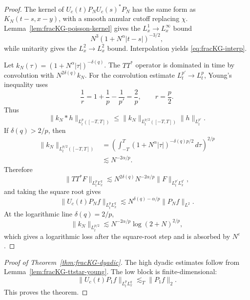 \documentclass[10pt]{amsart}
\numberwithin{equation}{section}
\theoremstyle{plain}
\theoremstyle{definition}
\theoremstyle{remark}
\begin{document}
\begin{proof}
The kernel of $U_c(t)P_NU_c(s)^*P_N$ has the same form as $K_N(t-s,x-y)$, with a smooth annular cutoff replacing $\chi$.  Lemma~\ref{lem:fracKG-poisson-kernel} gives the $L_x^1\to L_x^\infty$ bound
\[
        N^3(1+N^\alpha|t-s|)^{-3/2},
\]
while unitarity gives the $L_x^2\to L_x^2$ bound.  Interpolation yields \eqref{eq:fracKG-interp}.

Let $k_N(\tau)=(1+N^\alpha|\tau|)^{-\delta(q)}$.  The $TT^*$ operator is dominated in time by convolution with $N^{2\delta(q)}k_N$.  For the convolution estimate $L_t^{p'}\to L_t^p$, Young's inequality uses
\[
        \frac1r=1+\frac1p-\frac1{p'}=\frac2p,
        \qquad r=\frac p2.
\]
Thus
\[
        \|k_N*h\|_{L_t^p([-T,T])}
        \le \|k_N\|_{L_t^{p/2}([-T,T])}\|h\|_{L_t^{p'}}.
\]
If $\delta(q)>2/p$, then
\[
\begin{aligned}
        \|k_N\|_{L_t^{p/2}([-T,T])}
        &=\left(\int_{-T}^{T}(1+N^\alpha|\tau|)^{-\delta(q)p/2}\,d\tau\right)^{2/p}  \\
        &\lesssim N^{-2\alpha/p}.
\end{aligned}
\]
Therefore
\[
        \|TT^*F\|_{L_t^pL_x^q}
        \lesssim N^{2\delta(q)}N^{-2\alpha/p}\|F\|_{L_t^{p'}L_x^{q'}},
\]
and taking the square root gives
\[
        \|U_c(t)P_Nf\|_{L_t^pL_x^q}
        \lesssim N^{\delta(q)-\alpha/p}\|P_Nf\|_{L^2}.
\]
At the logarithmic line $\delta(q)=2/p$,
\[
        \|k_N\|_{L_t^{p/2}}
        \lesssim N^{-2\alpha/p}\log(2+N)^{2/p},
\]
which gives a logarithmic loss after the square-root step and is absorbed by $N^\varepsilon$.
\end{proof}

\begin{proof}[Proof of Theorem~\ref{thm:fracKG-dyadic}]
The high dyadic estimates follow from Lemma~\ref{lem:fracKG-ttstar-young}.  The low block is finite-dimensional:
\[
        \|U_c(t)P_1f\|_{L_t^pL_x^q}\lesssim_T\|P_1f\|_2.
\]
This proves the theorem.
\end{proof}
\end{document}
